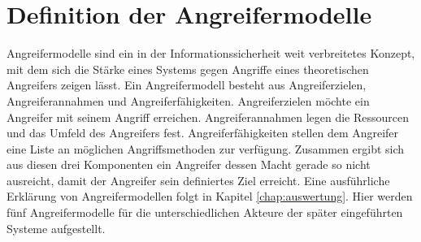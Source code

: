 \documentclass[
	fontsize=11pt,
	headings=small,
	parskip=half,           %
	bibliography=totoc,
	numbers=noenddot,       %
	open=any,               %
]{scrreprt}
\begin{document}
\section{Definition der Angreifermodelle}
Angreifermodelle sind ein in der Informationssicherheit weit verbreitetes Konzept, mit dem sich die Stärke eines Systems gegen Angriffe eines theoretischen Angreifers zeigen lässt. Ein Angreifermodell besteht aus Angreiferzielen, Angreiferannahmen und Angreiferfähigkeiten. Angreiferzielen möchte ein Angreifer mit seinem Angriff erreichen. Angreiferannahmen legen die Ressourcen und das Umfeld des Angreifers fest. Angreiferfähigkeiten stellen dem Angreifer eine Liste an möglichen Angriffsmethoden zur verfügung. Zusammen ergibt sich aus diesen drei Komponenten ein Angreifer dessen Macht gerade so nicht ausreicht, damit der Angreifer sein definiertes Ziel erreicht. Eine ausführliche Erklärung von Angreifermodellen folgt in Kapitel \ref{chap:auswertung}. Hier werden fünf Angreifermodelle für die unterschiedlichen Akteure der später eingeführten Systeme aufgestellt.\\
\end{document}
